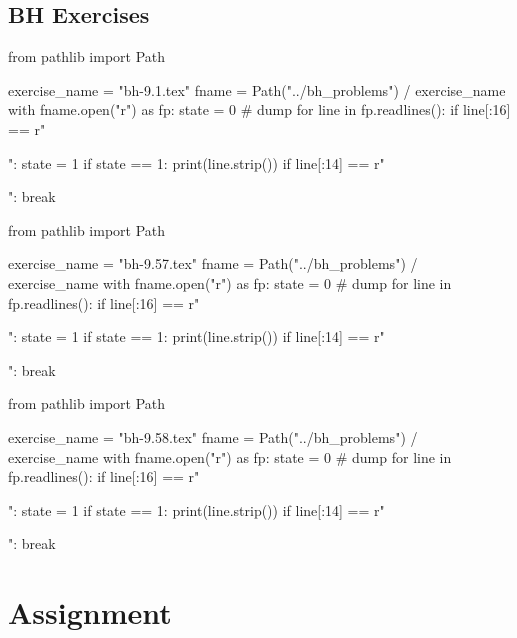 \subsection{BH Exercises}
\label{sec:bh-exercises-1}

\begin{pycode}
from pathlib import Path

exercise_name = "bh-9.1.tex"
fname = Path("../bh_problems") / exercise_name
with fname.open("r") as fp:
    state = 0  # dump
    for line in fp.readlines():
        if line[:16] == r"\begin{exercise}":
            state = 1
        if state == 1:
            print(line.strip())
        if line[:14] == r"\end{exercise}":
            break
\end{pycode}


\begin{pycode}
from pathlib import Path

exercise_name = "bh-9.57.tex"
fname = Path("../bh_problems") / exercise_name
with fname.open("r") as fp:
    state = 0  # dump
    for line in fp.readlines():
        if line[:16] == r"\begin{exercise}":
            state = 1
        if state == 1:
            print(line.strip())
        if line[:14] == r"\end{exercise}":
            break
\end{pycode}


\begin{pycode}
from pathlib import Path

exercise_name = "bh-9.58.tex"
fname = Path("../bh_problems") / exercise_name
with fname.open("r") as fp:
    state = 0  # dump
    for line in fp.readlines():
        if line[:16] == r"\begin{exercise}":
            state = 1
        if state == 1:
            print(line.strip())
        if line[:14] == r"\end{exercise}":
            break
\end{pycode}







\section{Assignment}
\label{sec:assignment}

%







